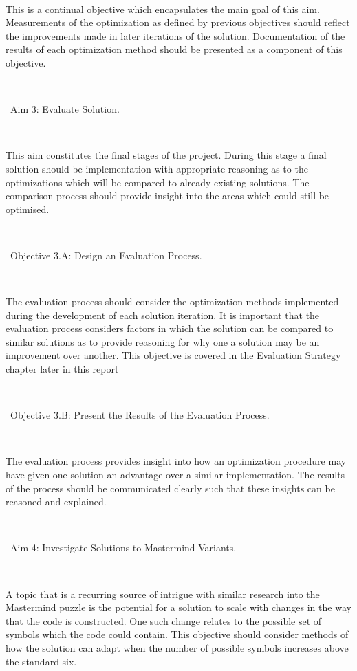\documentclass[11pt]{article}  %
\theoremstyle{definition}
\theoremstyle{remark}
\begin{document}
\

This is a continual objective which encapsulates the main goal of this aim. Measurements of the optimization as defined by previous 
objectives should reflect the improvements made in later iterations of the solution. Documentation of the results of each optimization 
method should be presented as a component of this objective.

\

\textbullet\ Aim 3: Evaluate Solution.

\

This aim constitutes the final stages of the project. During this stage a final solution should be implementation with appropriate reasoning 
as to the optimizations which will be compared to already existing solutions. The comparison process should provide insight into the 
areas which could still be optimised.

\

\textbullet\ Objective 3.A: Design an Evaluation Process.

\

The evaluation process should consider the optimization methods implemented during the development of each solution iteration. It is important
that the evaluation process considers factors in which the solution can be compared to similar solutions as to provide reasoning for why one
a solution may be an improvement over another. This objective is covered in the Evaluation Strategy chapter later in this report


\

\textbullet\ Objective 3.B: Present the Results of the Evaluation Process.

\

The evaluation process provides insight into how an optimization procedure may have given one solution an advantage over a similar implementation.
The results of the process should be communicated clearly such that these insights can be reasoned and explained.

\

\textbullet\ Aim 4: Investigate Solutions to Mastermind Variants.

\

A topic that is a recurring source of intrigue with similar research into the Mastermind puzzle is the potential for a solution to scale with
changes in the way that the code is constructed. One such change relates to the possible set of symbols which the code could contain.
This objective should consider methods of how the solution can adapt when the number of possible symbols increases above the standard six.
\end{document}
